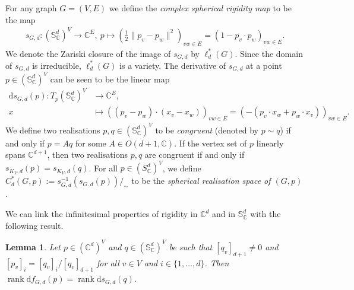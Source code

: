 \documentclass[11pt]{article}
\newtheorem{lemma}[theo]{Lemma}
\theoremstyle{definition}
\numberwithin{equation}{section}
\DeclareMathOperator{\rank}{rank}
\newcommand{\diff}{\mathrm{d}}
\begin{document}
For any graph $G=(V,E)$ we define the \emph{complex spherical rigidity map} to be the map
\begin{align*}
	s_{G,d} \colon (\mathbb{S}_{\mathbb{C}}^{d})^{V} \rightarrow \mathbb{C}^{E}, ~ p \mapsto \left( \frac{1}{2}\|p_v-p_w\|^2 \right)_{vw \in E} =\left( 1 - p_v \cdot p_w\right)_{vw \in E}.
\end{align*}
We denote the Zariski closure of the image of $s_{G,d}$ by $\ell^*_d(G)$.
Since the domain of $s_{G,d}$ is irreducible,
$\ell_d^*(G)$ is a variety.
The derivative of $s_{G,d}$ at a point $p \in (\mathbb{S}_{\mathbb{C}}^{d})^{V}$ can be seen to be the linear map
\begin{align*}
	\diff s_{G,d}(p) \colon T_p (\mathbb{S}_{\mathbb{C}}^{d})^{V} &\rightarrow \mathbb{C}^{E},\\
	x &\mapsto \left( (p_v-p_w) \cdot (x_v-x_w) \right)_{vw \in E} = \left(-(p_v \cdot x_w + p_w \cdot x_v) \right)_{vw \in E}.
\end{align*}
We define two realisations $p,q \in (\mathbb{S}_{\mathbb{C}}^{d})^V$ to be \emph{congruent} (denoted by $p \sim q$) if and only if $p = Aq$ for some $A \in O(d+1, \mathbb{C})$.
If the vertex set of $p$ linearly spans $\mathbb{C}^{d+1}$,
then two realisations $p,q$ are congruent if and only if $s_{K_V,d}(p) = s_{K_V,d}(q)$.
For all $p \in (S_\mathbb{C}^{d})^V$,
we define $C^*_d(G,p) := s^{-1}_{G,d} (s_{G,d}(p))/_\sim$ to be the \emph{spherical realisation space of $(G,p)$}.


We can link the infinitesimal properties of rigidity in $\mathbb{C}^d$ and in $\mathbb{S}^d_\mathbb{C}$ with the following result.

\begin{lemma}\label{l:equivrank}
	Let $p \in (\mathbb{C}^{d})^V$ and $q \in (\mathbb{S}_{\mathbb{C}}^{d})^V$ be such that $[q_{v}]_{d+1} \neq 0$ and $[p_v]_i = [q_v]_i/[q_v]_{d+1}$ for all $v \in V$ and $i \in \{1,\ldots,d\}$.
	Then $\rank \diff f_{G,d}(p)= \rank \diff s_{G,d}(q)$.
\end{lemma}
\end{document}
